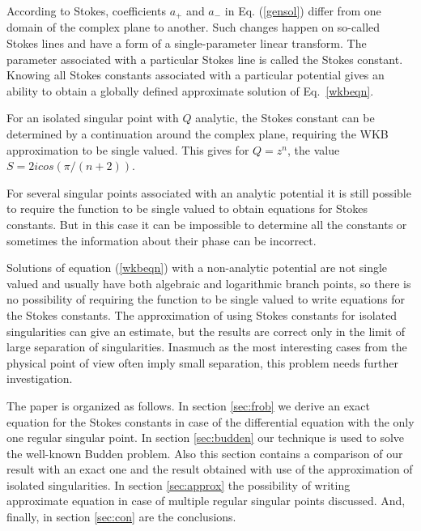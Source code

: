 \documentclass[aip,jmp,reprint]{revtex4-1}
\begin{document}
According to Stokes\cite{stokes}, coefficients $a_+$ and $a_-$ in Eq. (\ref{gensol}) differ from one domain of the complex plane to another. Such changes happen on so-called Stokes lines and have a form of a single-parameter linear transform\cite{heading}. The parameter associated with a particular Stokes line is called the Stokes constant. Knowing all Stokes constants associated with a particular potential gives an ability to obtain a globally defined approximate solution of Eq.~\ref{wkbeqn}\cite{heading,rwbook}.

For an isolated singular point with $Q$ analytic, the Stokes constant 
can be determined by a continuation around the complex plane, requiring the WKB approximation to be single valued.
This gives\cite[p.~83]{rwbook} for $Q = z^n$, the value $S = 2icos(\pi/(n+2))$.

For several singular points associated with an analytic potential it is still possible to require the function to be  single valued to obtain equations for Stokes constants. But in this case it can be impossible to determine all the constants or sometimes the information about their phase can be incorrect\cite[pp~243-245]{rwbook}.

Solutions of equation (\ref{wkbeqn}) with a non-analytic potential are not single valued and usually have both algebraic and logarithmic branch points, so there is no possibility of requiring the function to be single valued to write equations for the Stokes constants. The approximation of using Stokes constants  for isolated singularities can give an estimate, but the results are correct only in the limit of large separation of singularities. Inasmuch as the most interesting cases from the physical point of view often imply small separation, this problem needs further investigation.

The paper is organized as follows.
In section \ref{sec:frob} we derive an exact equation for the Stokes constants in case of the differential
equation with the only one regular singular point. 
In section \ref{sec:budden} our technique is used to solve the well-known Budden problem. Also this
section contains a comparison of our result with an exact one and the result obtained with use
of the approximation of isolated singularities.
In section \ref{sec:approx} the possibility of writing approximate equation in case of multiple 
regular singular points discussed.
And, finally, in section \ref{sec:con} are the conclusions. 
\end{document}
